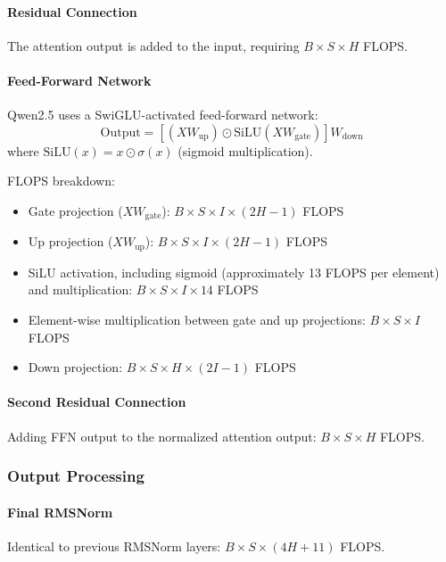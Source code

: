 \documentclass[11pt]{article}
\begin{document}
\paragraph{Residual Connection}
The attention output is added to the input, requiring $B \times S \times H$ FLOPS.

\paragraph{Feed-Forward Network}
Qwen2.5 uses a SwiGLU-activated feed-forward network:
\begin{equation}
    \text{Output} = \left[ (X W_{\text{up}}) \odot \text{SiLU}(X W_{\text{gate}}) \right] W_{\text{down}}
\end{equation}
where $\text{SiLU}(x) = x \odot \sigma(x)$ (sigmoid multiplication).

FLOPS breakdown:
\begin{itemize}
    \item Gate projection ($X W_{\text{gate}}$): $B \times S \times I \times (2H - 1)$ FLOPS
    \item Up projection ($X W_{\text{up}}$): $B \times S \times I \times (2H - 1)$ FLOPS
    \item SiLU activation, including sigmoid (approximately 13 FLOPS per element) and multiplication: $B \times S \times I \times 14$ FLOPS
    \item Element-wise multiplication between gate and up projections: $B \times S \times I$ FLOPS
    \item Down projection: $B \times S \times H \times (2I - 1)$ FLOPS
\end{itemize}

\paragraph{Second Residual Connection}
Adding FFN output to the normalized attention output: $B \times S \times H$ FLOPS.

\subsubsection{Output Processing}

\paragraph{Final RMSNorm}
Identical to previous RMSNorm layers: $B \times S \times (4H + 11)$ FLOPS.
\end{document}
